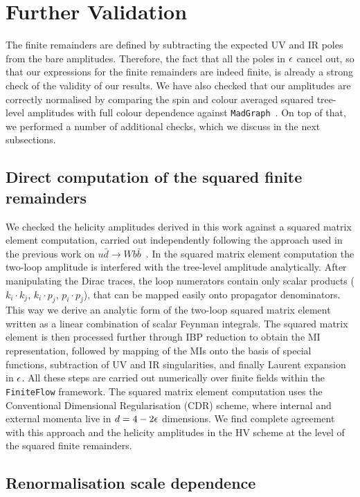 \documentclass[main.tex]{subfiles}
\begin{document}
\section{Further Validation}
\label{Hbbsec:validation}

The finite remainders are defined by subtracting the expected UV and IR poles from the bare amplitudes. Therefore, the fact that all the poles in $\epsilon$ cancel out, so that our expressions for the finite remainders are indeed finite, is already a strong check of the validity of our results. We have also checked that our amplitudes are correctly normalised by comparing the spin and colour averaged squared tree-level amplitudes with full colour dependence against \texttt{MadGraph}~\cite{Alwall:2014hca}.
On top of that, we performed a number of additional checks, which we discuss in the next subsections.


\subsection{Direct computation of the squared finite remainders} 

We checked the helicity amplitudes derived in this work against a squared matrix element computation, carried out independently following the approach used in the previous work on $u\bar{d}\to Wb\bar{b}$~\cite{Badger:2021nhg}.
In the squared matrix element computation the two-loop amplitude is interfered with the tree-level amplitude analytically. After manipulating the
Dirac traces, the loop numerators contain only scalar products ($k_i \cdot k_j$, $k_i \cdot p_j$, $p_i \cdot p_j$), that can be mapped easily onto propagator denominators. This way we derive an analytic form of the two-loop squared matrix element written as a linear combination of scalar Feynman integrals. The squared matrix element is then processed further through IBP reduction to obtain the MI representation, followed by mapping of the MIs onto the basis of special functions, subtraction of UV and IR singularities, and finally Laurent expansion in $\epsilon$. 
All these steps are carried out numerically over finite fields within the \texttt{FiniteFlow} framework. 
The squared matrix element computation uses the Conventional Dimensional Regularisation (CDR) scheme, where internal and external momenta live in $d=4-2 \epsilon$ dimensions. We find complete agreement with this approach and the helicity amplitudes in the HV scheme at the level of the squared finite remainders.


\subsection{Renormalisation scale dependence} \label{Hbbsec:renormscaledep}
\end{document}
